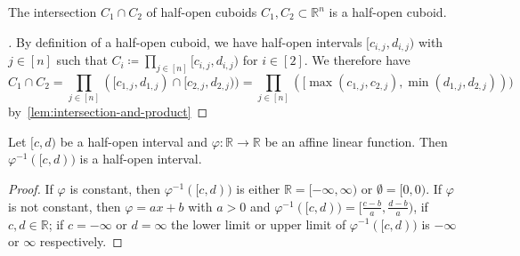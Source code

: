 \begin{lemma}\label{lem:intersection-cuboid}
  The intersection \(C_1∩C_2\) of half-open cuboids \(C_1,C_2⊂ℝ^n\) is a half-open cuboid.
\end{lemma}

\begin{proof}[]
  By definition of a half-open cuboid, we have half-open intervals \([c_{i,j},d_{i,j})\) with \(j∈[n]\) such that \(C_i≔\prod_{j∈[n]}[c_{i,j},d_{i,j})\) for \(i∈[2]\). We therefore have
  \[ C_1∩C_2=\prod_{j∈[n]}([c_{1,j},d_{1,j})∩[c_{2,j},d_{2,j}))=\prod_{j∈[n]}([\max(c_{1,j},c_{2,j}),\min(d_{1,j},d_{2,j}))) \]
  by~\autoref{lem:intersection-and-product}
\end{proof}


\begin{lemma}\label{lem:pre-image-half-open-int}
  Let \([c,d)\) be a half-open interval and \(φ:ℝ→ℝ\) be an affine linear function. Then \(φ^{-1}([c,d))\) is a half-open interval.
\end{lemma}


\begin{proof}
  If \(φ\) is constant, then \(φ^{-1}([c,d))\) is either \(ℝ=[-∞,∞)\) or \(∅=[0,0)\).
  If \(φ\) is not constant, then \(φ=ax+b\) with \(a>0\) and \(φ^{-1}([c,d))=[\frac{c-b}{a},\frac{d-b}{a})\), if \(c,d∈ℝ\); if \(c=-∞\) or \(d=∞\) the lower limit or upper limit of \(φ^{-1}([c,d))\) is \(-∞\) or \(∞\) respectively.
\end{proof}

